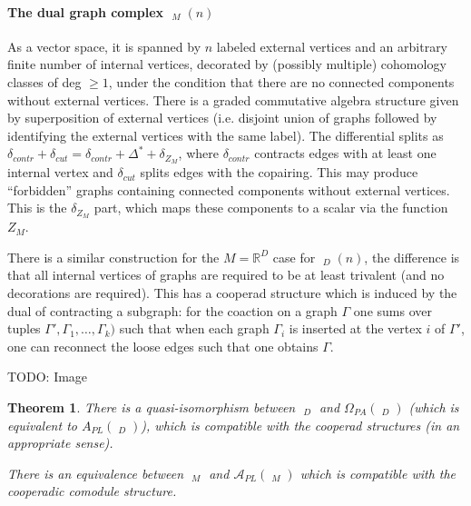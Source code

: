\documentclass{scrartcl}
\theoremstyle{plain}
\newtheorem{theorem}{Theorem}[section]
\theoremstyle{definition}
\newcommand{\R}{\mathbb R}
\newcommand{\APL}{A_{PL}}
\DeclareMathOperator{\cConf}{\overline{Conf}}
\DeclareMathOperator{\coGraphs}{{}^*Graphs}
\begin{document}
\paragraph{The dual graph complex $\coGraphs_M(n)$} As a vector space, it is spanned by $n$ labeled external vertices and an arbitrary finite number of internal vertices, decorated by (possibly multiple) cohomology classes of deg $\geq 1$, under the condition that there are no connected components without external vertices. There is a graded commutative algebra structure given by superposition of external vertices (i.e. disjoint union of graphs followed by identifying the external vertices with the same label). The differential splits as $\delta_{contr} + \delta_{cut} = \delta_{contr} + \Delta^* + \delta_{Z_M}$, where $\delta_{contr}$ contracts edges with at least one internal vertex and $\delta_{cut}$ splits edges with the copairing. This may produce ``forbidden'' graphs containing connected components without external vertices. This is the $\delta_{Z_M}$ part, which maps these components to a scalar via the function $Z_M$.

There is a similar construction for the $M=\R^D$ case for $\coGraphs_D(n)$, the difference is that all internal vertices of graphs are required to be at least trivalent (and no decorations are required). This has a cooperad structure which is induced by the dual of contracting a subgraph: for the coaction on a graph $\Gamma$ one sums over tuples $\Gamma', \Gamma_1, \dots, \Gamma_k)$ such that when each graph $\Gamma_i$ is inserted at the vertex $i$ of $\Gamma'$, one can reconnect the loose edges such that one obtains $\Gamma$.  

TODO: Image

\begin{theorem}
There is a quasi-isomorphism between $\coGraphs_D$ and $\Omega_{PA}(\cConf_D)$ (which is equivalent to $\APL(\cConf_D)$), which is compatible with the cooperad structures (in an appropriate sense).

There is an equivalence between $\coGraphs_M$ and $\mathcal \APL(\cConf_M)$ which is compatible with the cooperadic comodule structure. 
\end{theorem}
\end{document}
